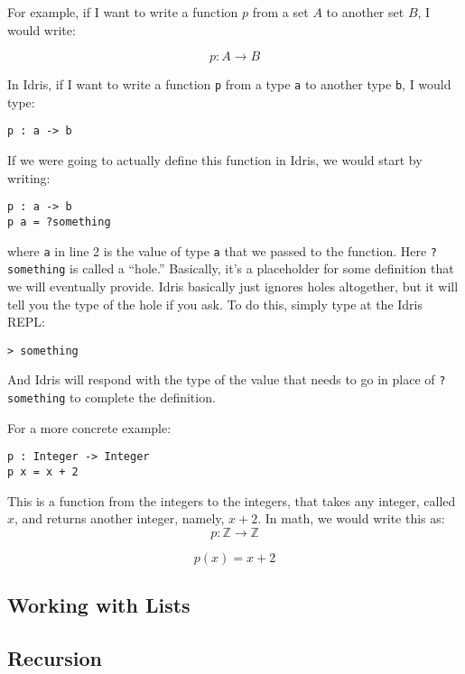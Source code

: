 \documentclass{article}
\newcommand{\inline}[1]{\texttt{#1}}
\begin{document}
For example, if I want to write a function $p$ from a set $A$ to another set $B$, I would write:

$$p : A \rightarrow B$$

In Idris, if I want to write a function \inline{p} from a type \inline{a} to another type \inline{b}, I would type:

\begin{verbatim}
p : a -> b
\end{verbatim}

If we were going to actually define this function in Idris, we would start by writing:

\begin{verbatim}
p : a -> b
p a = ?something
\end{verbatim}

where \inline{a} in line 2 is the value of type \inline{a} that we passed to the function.
Here \inline{?something} is called a ``hole.''
Basically, it's a placeholder for some definition that we will eventually provide.
Idris basically just ignores holes altogether, but it will tell you the type of the hole if you ask.
To do this, simply type at the Idris REPL:

\begin{verbatim}
> something
\end{verbatim}

And Idris will respond with the type of the value that needs to go in place of \inline{?something} to complete the definition.

For a more concrete example:

\begin{verbatim}
p : Integer -> Integer
p x = x + 2
\end{verbatim}

This is a function from the integers to the integers, that takes any integer, called $x$, and returns another integer, namely, $x + 2$.
In math, we would write this as:
\[
    p : \mathbb{Z} \rightarrow \mathbb{Z}
\]

\[
    p(x) = x + 2
\]

\subsection{Working with Lists}

\subsection{Recursion}
\end{document}
